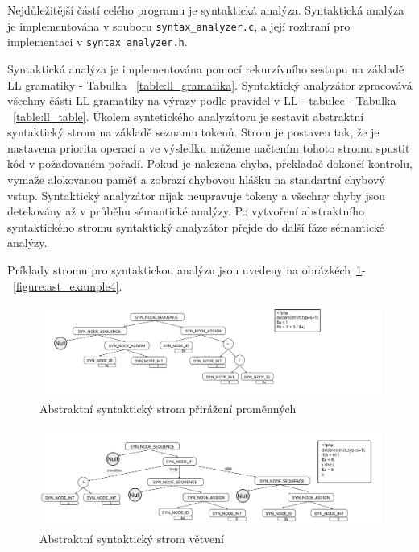 \documentclass[a4paper, 11pt]{article}
\begin{document}
	Nejdůležitější částí celého programu je syntaktická analýza. Syntaktická analýza je implementována v souboru
	\texttt{syntax\_analyzer.c}, a její rozhraní pro implementaci v \texttt{syntax\_analyzer.h}.

	Syntaktická analýza je implementována pomocí rekurzívního sestupu na základě LL gramatiky - Tabulka ~\ref{table:ll_gramatika}. Syntaktický
	analyzátor zpracovává všechny části LL gramatiky na výrazy podle pravidel v LL - tabulce - Tabulka ~\ref{table:ll_table}. Úkolem
	syntetického analyzátoru je sestavit abstraktní syntaktický strom na základě seznamu tokenů. Strom je postaven
	tak, že je nastavena priorita operací a ve výsledku můžeme načtením tohoto stromu spustit kód v
	požadovaném pořadí. Pokud je nalezena chyba, překladač dokončí kontrolu, vymaže alokovanou paměť
	a zobrazí chybovou hlášku na standartní chybový vstup. Syntaktický analyzátor nijak neupravuje tokeny a všechny
	chyby jsou detekovány až v průběhu sémantické analýzy. Po vytvoření abstraktního syntaktického stromu
	syntaktický analyzátor přejde do další fáze sémantické analýzy.

	Príklady stromu pro syntaktickou analýzu jsou uvedeny na obrázkéch~\ref{figure:ast_example1}-~\ref{figure:ast_example4}.

	\newpage

	\begin{figure}[!ht]
		\centering
		\includegraphics[width=1\linewidth]{assign.pdf}
		\caption{Abstraktní syntaktický strom přirážení proměnných}
		\label{figure:ast_example1}
	\end{figure}

    \begin{figure}[!ht]
		\centering
		\includegraphics[width=1\linewidth]{if.pdf}
		\caption{Abstraktní syntaktický strom větvení}
		\label{figure:ast_example2}
	\end{figure}
\end{document}
